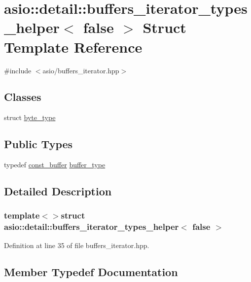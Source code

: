 \hypertarget{structasio_1_1detail_1_1buffers__iterator__types__helper_3_01false_01_4}{}\section{asio\+:\+:detail\+:\+:buffers\+\_\+iterator\+\_\+types\+\_\+helper$<$ false $>$ Struct Template Reference}
\label{structasio_1_1detail_1_1buffers__iterator__types__helper_3_01false_01_4}


{\ttfamily \#include $<$asio/buffers\+\_\+iterator.\+hpp$>$}

\subsection*{Classes}
\begin{DoxyCompactItemize}
\item 
struct \hyperlink{structasio_1_1detail_1_1buffers__iterator__types__helper_3_01false_01_4_1_1byte__type}{byte\+\_\+type}
\end{DoxyCompactItemize}
\subsection*{Public Types}
\begin{DoxyCompactItemize}
\item 
typedef \hyperlink{classasio_1_1const__buffer}{const\+\_\+buffer} \hyperlink{structasio_1_1detail_1_1buffers__iterator__types__helper_3_01false_01_4_ab4d0d844258fc4683e4c9922a99b963e}{buffer\+\_\+type}
\end{DoxyCompactItemize}


\subsection{Detailed Description}
\subsubsection*{template$<$$>$struct asio\+::detail\+::buffers\+\_\+iterator\+\_\+types\+\_\+helper$<$ false $>$}



Definition at line 35 of file buffers\+\_\+iterator.\+hpp.



\subsection{Member Typedef Documentation}
\hypertarget{structasio_1_1detail_1_1buffers__iterator__types__helper_3_01false_01_4_ab4d0d844258fc4683e4c9922a99b963e}{}
